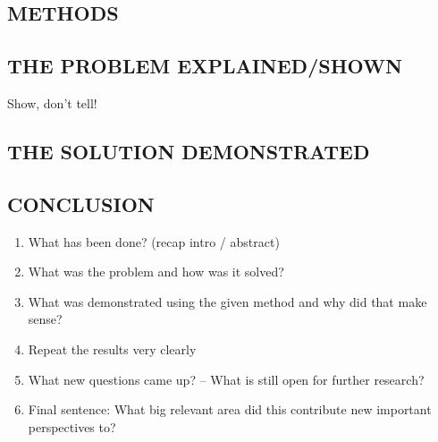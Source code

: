 \documentclass{article}
\begin{document}
\begin{tcolorbox}\subsection*{\MakeUppercase{Methods}}\color{white}\lipsum[75]\end{tcolorbox}

\begin{tcolorbox}\subsection*{\MakeUppercase{The Problem Explained/Shown}}{\scriptsize Show, don't tell!}
\color{white}\lipsum[75]\end{tcolorbox}
\begin{tcolorbox}\subsection*{\MakeUppercase{The Solution Demonstrated}}\color{white}\lipsum[55]\end{tcolorbox}

\begin{tcolorbox}\subsection*{\MakeUppercase{Conclusion}}
\begin{enumerate}\footnotesize
    \item What has been done? (recap intro / abstract)\\[0.5em]
    \item What was the problem and how was it solved?\\[0.5em]
    \item What was demonstrated using the given method and why did that make sense?\\[0.5em]
    \item Repeat the results very clearly\\[0.5em]
    \item What new questions came up? -- What is still open for further research?\\[0.5em]
    \item Final sentence: What big relevant area did this contribute new important perspectives to?\\[1em]
\end{enumerate}\end{tcolorbox}
\end{document}
